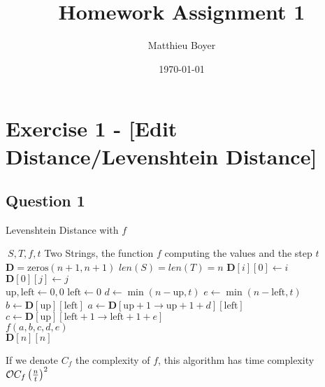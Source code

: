 \documentclass{cours}
\title{Homework Assignment 1}
\author{Matthieu Boyer}
\date{\today}
\begin{document}
\section{Exercise 1 - [Edit Distance/Levenshtein Distance]}
\subsection{Question 1}
\begin{algorithm}
    \caption{Levenshtein Distance with $f$}
    \begin{algorithmic}
        \Input $\ S, T, f, t$ \Comment Two Strings, the function $f$ computing the values and the step $t$
        \EndInput\\
        \State $\mathbf{D} = \text{zeros}(n + 1, n + 1)$ \Comment $len(S) = len(T) = n$
            \State $\mathbf{D}[i][0] \gets i$
        \EndFor\\
            \State $\mathbf{D}[0][j] \gets j$
        \EndFor\\
        \State $\text{up}, \text{left} \gets 0, 0$
            \State $\text{left} \gets 0$
                \State $d \gets \min(n-\text{up}, t)$
                \State $e \gets \min(n-\text{left}, t)$\\
                \State $b \gets \mathbf{D}[\text{up}][\text{left}]$
                \State $a \gets \mathbf{D}[\text{up} + 1 \rightarrow \text{up} + 1 + d][\text{left}]$
                \State $c \gets \mathbf{D}[\text{up}][\text{left} + 1 \rightarrow \text{left} + 1 + e]$\\
                \State $f(a, b, c, d, e)$ 
            \EndWhile
        \EndWhile\\

        \Return $\mathbf{D}[n][n]$
    
    \end{algorithmic}
\end{algorithm}
\begin{proposition}
    If we denote $C_{f}$ the complexity of $f$, this algorithm has time complexity $\mathcal{O}{C_{f}\left(\frac{n}{t}\right)^{2}}$
\end{proposition}
\end{document}
